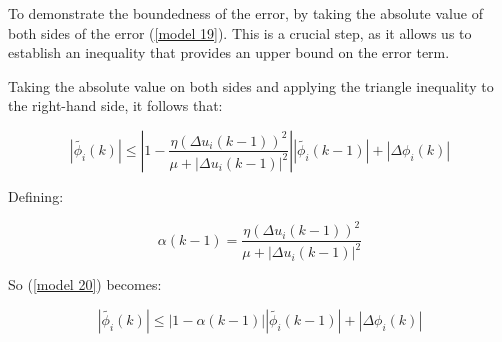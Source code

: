 \documentclass[journal,onecolumn]{IEEEtran}
\begin{document}





To demonstrate the boundedness of the error, by taking the absolute value of both sides of the error (\ref{model 19}). This is a crucial step, as it allows us to establish an inequality that provides an upper bound on the error term.

Taking the absolute value on both sides and applying the triangle inequality to the right-hand side, it follows that:

\begin{equation}
\label{model 20}
|\tilde{\phi_i}(k)| \leq \left| 1 - \frac{\eta (\Delta u_i(k-1))^2}{\mu + |\Delta u_i(k-1)|^2} \right| |\tilde{\phi_i}(k-1)| + |\Delta \phi_i(k)|
\end{equation}

Defining:

\begin{equation}
\label{model 21}
\alpha(k-1) = \frac{\eta (\Delta u_i(k-1))^2}{\mu + |\Delta u_i(k-1)|^2}
\end{equation}

So  (\ref{model 20}) becomes:

\begin{equation}
\label{model 22}
|\tilde{\phi_i}(k)| \leq |1 - \alpha(k-1)| |\tilde{\phi_i}(k-1)| + |\Delta \phi_i(k)|
\end{equation}
\end{document}
